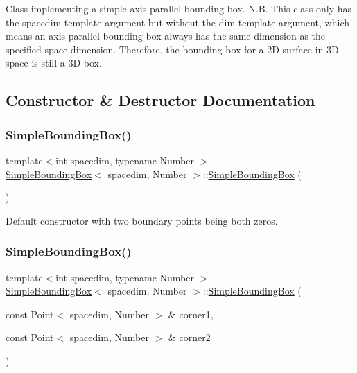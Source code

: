 Class implementing a simple axis-\/parallel bounding box. N.\+B. This class only has the {\ttfamily spacedim} template argument but without the {\ttfamily dim} template argument, which means an axis-\/parallel bounding box always has the same dimension as the specified space dimension. Therefore, the bounding box for a 2D surface in 3D space is still a 3D box. 

\subsection{Constructor \& Destructor Documentation}
\mbox{\label{classSimpleBoundingBox_a6975b3ff39148250f0b4dfdd90194653}} 
\subsubsection{\texorpdfstring{Simple\+Bounding\+Box()}{SimpleBoundingBox()}\hspace{0.1cm}{\footnotesize\ttfamily [1/7]}}
{\footnotesize\ttfamily template$<$int spacedim, typename Number $>$ \\
\hyperlink{classSimpleBoundingBox}{Simple\+Bounding\+Box}$<$ spacedim, Number $>$\+::\hyperlink{classSimpleBoundingBox}{Simple\+Bounding\+Box} (\begin{DoxyParamCaption}{ }\end{DoxyParamCaption})}

Default constructor with two boundary points being both zeros. \mbox{\label{classSimpleBoundingBox_a2ef944074a061d1813d46edb437706df}} 
\subsubsection{\texorpdfstring{Simple\+Bounding\+Box()}{SimpleBoundingBox()}\hspace{0.1cm}{\footnotesize\ttfamily [2/7]}}
{\footnotesize\ttfamily template$<$int spacedim, typename Number $>$ \\
\hyperlink{classSimpleBoundingBox}{Simple\+Bounding\+Box}$<$ spacedim, Number $>$\+::\hyperlink{classSimpleBoundingBox}{Simple\+Bounding\+Box} (\begin{DoxyParamCaption}\item[{const Point$<$ spacedim, Number $>$ \&}]{corner1,  }\item[{const Point$<$ spacedim, Number $>$ \&}]{corner2 }\end{DoxyParamCaption})}

